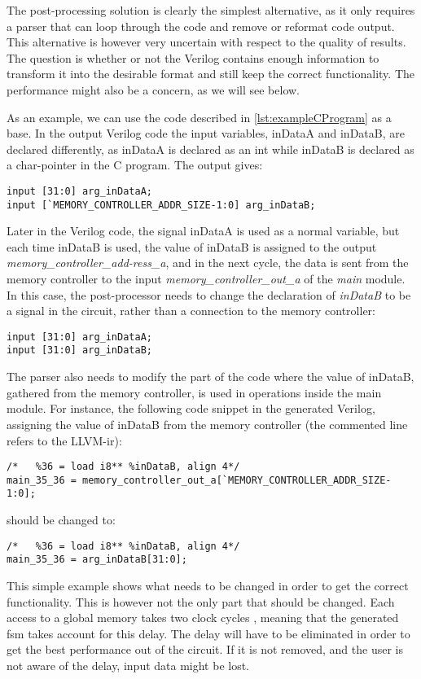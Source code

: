 The post-processing solution is clearly the simplest alternative, as it only requires a parser that can loop through the code and remove or reformat code output. This alternative is however very uncertain with respect to the quality of results. The question is whether or not the Verilog contains enough information to transform it into the desirable format and still keep the correct functionality. The performance might also be a concern, as we will see below.

As an example, we can use the code described in \cref{lst:exampleCProgram} as a base. In the output Verilog code the input variables, inDataA and inDataB, are declared differently, as inDataA is declared as an int while inDataB is declared as a char-pointer in the C program. The output gives:
\lstset{language=Verilog, style=Verilogstyle}
\begin{lstlisting}
input [31:0] arg_inDataA;
input [`MEMORY_CONTROLLER_ADDR_SIZE-1:0] arg_inDataB;
\end{lstlisting}
Later in the Verilog code, the signal inDataA is used as a normal variable, but each time inDataB is used, the value of inDataB is assigned to the output \textit{memory\_controller\_add-ress\_a}, and in the next cycle, the data is sent from the memory controller to the input \textit{memory\_controller\_out\_a} of the \textit{main} module. In this case, the post-processor needs to change the declaration of \textit{inDataB} to be a signal in the circuit, rather than a connection to the memory controller:
\begin{lstlisting}
input [31:0] arg_inDataA;
input [31:0] arg_inDataB;
\end{lstlisting}
The parser also needs to modify the part of the code where the value of inDataB, gathered from the memory controller, is used in operations inside the main module. For instance, the following code snippet in the generated Verilog, assigning the value of inDataB from the memory controller (the commented line refers to the LLVM-\gls{ir}):
\begin{lstlisting}
/*   %36 = load i8** %inDataB, align 4*/
main_35_36 = memory_controller_out_a[`MEMORY_CONTROLLER_ADDR_SIZE-1:0];
\end{lstlisting}
should be changed to:
\begin{lstlisting}
/*   %36 = load i8** %inDataB, align 4*/
main_35_36 = arg_inDataB[31:0];
\end{lstlisting}
This simple example shows what needs to be changed in order to get the correct functionality. This is however not the only part that should be changed. Each access to a global memory takes two clock cycles \cite{leguparch}, meaning that the generated \gls{fsm} takes account for this delay. The delay will have to be eliminated in order to get the best performance out of the circuit. If it is not removed, and the user is not aware of the delay, input data might be lost.

